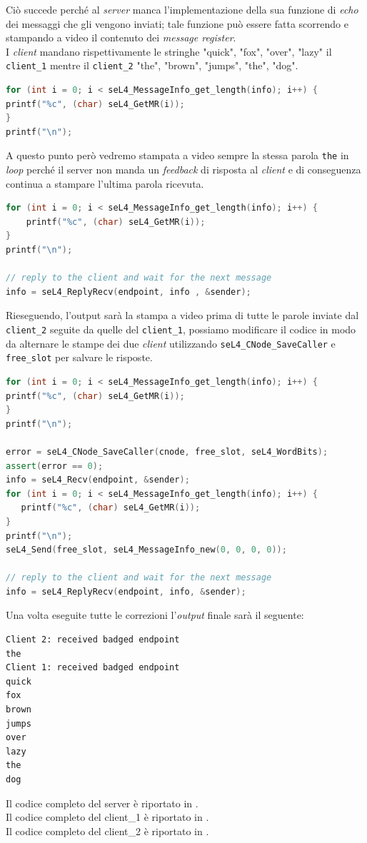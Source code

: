 Ciò succede perché al \textit{server} manca l'implementazione della sua funzione di \textit{echo} dei messaggi che gli vengono inviati; tale funzione può essere fatta scorrendo e stampando a video il contenuto dei \textit{message register}.\\
I \textit{client} mandano rispettivamente le stringhe {"quick", "fox", "over", "lazy"} il \texttt{client\_1} mentre il \texttt{client\_2} {"the", "brown", "jumps", "the", "dog"}.
\begin{lstlisting}[language=C++]
for (int i = 0; i < seL4_MessageInfo_get_length(info); i++) {
printf("%c", (char) seL4_GetMR(i));
}
printf("\n");
\end{lstlisting}

A questo punto però vedremo stampata a video sempre la stessa parola \texttt{the} in \textit{loop} perché il server non manda un \textit{feedback} di risposta al \textit{client} e di conseguenza continua a stampare l'ultima parola ricevuta.
\begin{lstlisting}[language=C++]
for (int i = 0; i < seL4_MessageInfo_get_length(info); i++) {
	printf("%c", (char) seL4_GetMR(i));
}
printf("\n");

// reply to the client and wait for the next message
info = seL4_ReplyRecv(endpoint, info , &sender);
\end{lstlisting}

Rieseguendo, l'output sarà la stampa a video prima di tutte le parole inviate dal \texttt{client\_2} seguite da quelle del \texttt{client\_1}, possiamo modificare il codice in modo da alternare le stampe dei due \textit{client} utilizzando \texttt{seL4\_CNode\_SaveCaller} e \texttt{free\_slot} per salvare le risposte.
\begin{lstlisting}[language=C++]
for (int i = 0; i < seL4_MessageInfo_get_length(info); i++) {
printf("%c", (char) seL4_GetMR(i));
}
printf("\n");

error = seL4_CNode_SaveCaller(cnode, free_slot, seL4_WordBits);
assert(error == 0);
info = seL4_Recv(endpoint, &sender);
for (int i = 0; i < seL4_MessageInfo_get_length(info); i++) {
   printf("%c", (char) seL4_GetMR(i));
}
printf("\n");
seL4_Send(free_slot, seL4_MessageInfo_new(0, 0, 0, 0));

// reply to the client and wait for the next message
info = seL4_ReplyRecv(endpoint, info, &sender);
\end{lstlisting}

Una volta eseguite tutte le correzioni l'\textit{output} finale sarà il seguente:
\begin{lstlisting}[language=bash]
Client 2: received badged endpoint
the
Client 1: received badged endpoint
quick
fox
brown
jumps
over
lazy
the
dog
\end{lstlisting}
Il codice completo del server è riportato in \cite{IPCserver}.\\
Il codice completo del client\_1 è riportato in \cite{IPCclient1}.\\
Il codice completo del client\_2 è riportato in \cite{IPCclient2}.